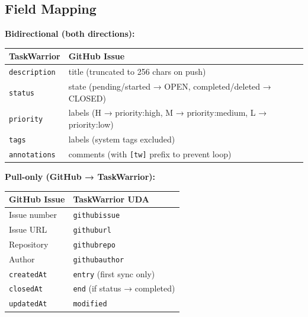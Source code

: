 \documentclass[
]{article}
\newcounter{none} %
\begin{document}
\subsection{Field Mapping}\label{field-mapping}

\textbf{Bidirectional (both directions):}

{\def\LTcaptype{none} %
\begin{longtable}[]{@{}
  >{\raggedright\arraybackslash}p{}
  >{\raggedright\arraybackslash}p{}@{}}
\toprule\noalign{}
\begin{minipage}[b]{\linewidth}\raggedright
TaskWarrior
\end{minipage} & \begin{minipage}[b]{\linewidth}\raggedright
GitHub Issue
\end{minipage} \\
\midrule\noalign{}
\endhead
\bottomrule\noalign{}
\endlastfoot
\texttt{description} & title (truncated to 256 chars on push) \\
\texttt{status} & state (pending/started → OPEN, completed/deleted →
CLOSED) \\
\texttt{priority} & labels (H → priority:high, M → priority:medium, L →
priority:low) \\
\texttt{tags} & labels (system tags excluded) \\
\texttt{annotations} & comments (with \texttt{{[}tw{]}} prefix to
prevent loop) \\
\end{longtable}
}

\textbf{Pull-only (GitHub → TaskWarrior):}

{\def\LTcaptype{none} %
\begin{longtable}[]{@{}ll@{}}
\toprule\noalign{}
GitHub Issue & TaskWarrior UDA \\
\midrule\noalign{}
\endhead
\bottomrule\noalign{}
\endlastfoot
Issue number & \texttt{githubissue} \\
Issue URL & \texttt{githuburl} \\
Repository & \texttt{githubrepo} \\
Author & \texttt{githubauthor} \\
\texttt{createdAt} & \texttt{entry} (first sync only) \\
\texttt{closedAt} & \texttt{end} (if status → completed) \\
\texttt{updatedAt} & \texttt{modified} \\
\end{longtable}
}
\end{document}
